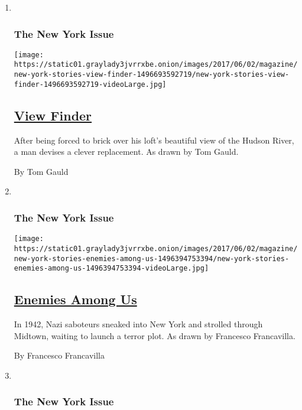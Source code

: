 \begin{enumerate}
\def\labelenumi{\arabic{enumi}.}
\item ~
  \hypertarget{the-new-york-issue-9}{%
  \subsubsection{The New York Issue}\label{the-new-york-issue-9}}

  \texttt{[image: https://static01.graylady3jvrrxbe.onion/images/2017/06/02/magazine/new-york-stories-view-finder-1496693592719/new-york-stories-view-finder-1496693592719-videoLarge.jpg]}

  \hypertarget{view-finder}{%
  \subsection{\texorpdfstring{\href{/interactive/2017/06/02/magazine/new-york-stories-view-finder.html}{View
  Finder}}{View Finder}}\label{view-finder}}

  After being forced to brick over his loft's beautiful view of the
  Hudson River, a man devises a clever replacement. As drawn by Tom
  Gauld.

  By Tom Gauld
\item ~
  \hypertarget{the-new-york-issue-10}{%
  \subsubsection{The New York Issue}\label{the-new-york-issue-10}}

  \texttt{[image: https://static01.graylady3jvrrxbe.onion/images/2017/06/02/magazine/new-york-stories-enemies-among-us-1496394753394/new-york-stories-enemies-among-us-1496394753394-videoLarge.jpg]}

  \hypertarget{enemies-among-us}{%
  \subsection{\texorpdfstring{\href{/interactive/2017/06/02/magazine/new-york-stories-enemies-among-us.html}{Enemies
  Among Us}}{Enemies Among Us}}\label{enemies-among-us}}

  In 1942, Nazi saboteurs sneaked into New York and strolled through
  Midtown, waiting to launch a terror plot. As drawn by Francesco
  Francavilla.

  By Francesco Francavilla
\item ~
  \hypertarget{the-new-york-issue-11}{%
  \subsubsection{The New York Issue}\label{the-new-york-issue-11}}


\end{enumerate}
